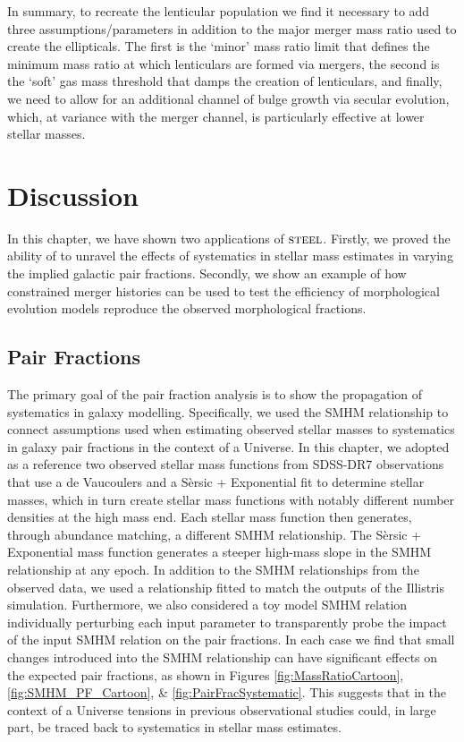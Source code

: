 In summary, to recreate the lenticular population we find it necessary to add three assumptions/parameters in addition to the major merger mass ratio used to create the ellipticals. The first is the `minor' mass ratio limit that defines the minimum mass ratio at which lenticulars are formed via mergers, the second is the `soft' gas mass threshold that damps the creation of lenticulars, and finally, we need to allow for an additional channel of bulge growth via secular evolution, which, at variance with the merger channel, is particularly effective at lower stellar masses. 

\section{Discussion}

In this chapter, we have shown two applications of $\textsc{steel}$. Firstly, we proved the ability of \steel to unravel the effects of systematics in stellar mass estimates in varying the implied galactic pair fractions. Secondly, we show an example of how constrained merger histories can be used to test the efficiency of morphological evolution models reproduce the observed morphological fractions.  

\subsection{Pair Fractions}

The primary goal of the pair fraction analysis is to show the propagation of systematics in galaxy modelling. 
Specifically, we used the SMHM relationship to connect assumptions used when estimating observed stellar masses to systematics in galaxy pair fractions in the context of a \LCDM Universe. 
In this chapter, we adopted as a reference two observed stellar mass functions from SDSS-DR7 observations that use a de Vaucoulers and a S\`ersic + Exponential fit to determine stellar masses, which in turn create stellar mass functions with notably different number densities at the high mass end. Each stellar mass function then generates, through abundance matching, a different SMHM relationship. The S\`ersic + Exponential mass function generates a steeper high-mass slope in the SMHM relationship at any epoch.
In addition to the SMHM relationships from the observed data, we used a relationship fitted to match the outputs of the Illistris simulation. Furthermore, we also considered a toy model SMHM relation individually perturbing each input parameter to transparently probe the impact of the input SMHM relation on the pair fractions.
In each case we find that small changes introduced into the SMHM relationship can have significant effects on the expected pair fractions, as shown in Figures \ref{fig:MassRatioCartoon},\ref{fig:SMHM_PF_Cartoon}, \& \ref{fig:PairFracSystematic}.
This suggests that in the context of a \LCDM Universe tensions in previous observational studies could, in large part, be traced back to systematics in stellar mass estimates.

